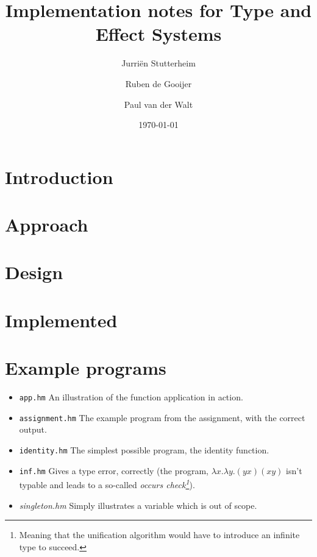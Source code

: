 \documentclass[a4paper]{article}
\author{Jurri\"en Stutterheim\and Ruben de Gooijer \and Paul van der Walt}
\date{\today}
\title{Implementation notes for Type and Effect Systems}
\begin{document}
\maketitle \tableofcontents

\section{Introduction}


\section{Approach}


\section{Design}



\section{Implemented}

\section{Example programs}

\begin{itemize}
    \item \texttt{app.hm} An illustration of the function application in action. 
    \item \texttt{assignment.hm} The example program from the assignment, with
        the correct output. 
    \item \texttt{identity.hm} The simplest possible program, the identity
        function. 
    \item \texttt{inf.hm} Gives a type error, correctly (the program, $\lambda
        x.
        \lambda y . (y x) (x y)$ isn't typable and leads to a so-called
        \emph{occurs check\footnote{Meaning that the unification algorithm would
        have to introduce an infinite type to succeed.}}).
    \item \textit{singleton.hm} Simply illustrates a variable which is out of
        scope. 
\end{itemize}
\end{document}
